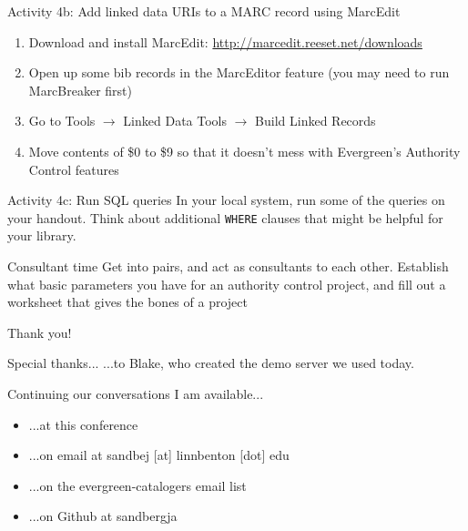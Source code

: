 \documentclass{beamer}
\begin{document}
\begin{frame}{Activity 4b: Add linked data URIs to a MARC record using MarcEdit}
 \begin{enumerate}
  \item Download and install MarcEdit: \url{http://marcedit.reeset.net/downloads}
  \item Open up some bib records in the MarcEditor feature (you may need to run MarcBreaker first)
  \item Go to Tools $\rightarrow$ Linked Data Tools $\rightarrow$ Build Linked Records
  \item Move contents of \$0 to \$9 so that it doesn't mess with Evergreen's Authority Control features
  
 \end{enumerate}

\end{frame}

\begin{frame}{Activity 4c: Run SQL queries}
In your local system, run some of the queries on your handout.  Think about additional \texttt{WHERE} clauses that might be helpful for your library.
\end{frame}



\begin{frame}{Consultant time}
Get into pairs, and act as consultants to each other.  Establish what basic parameters you have for an authority control project, and fill out a worksheet that gives the bones of a project

\end{frame}


\begin{frame}{Thank you!}

\begin{block}{Special thanks...}
...to Blake, who created the demo server we used today.
\end{block}

\begin{block}{Continuing our conversations}
I am available...
\begin{itemize}
 \item ...at this conference
 \item ...on email at sandbej [at] linnbenton [dot] edu
 \item ...on the evergreen-catalogers email list
 \item ...on Github at sandbergja
\end{itemize}

\end{block}



\end{frame}
\end{document}
